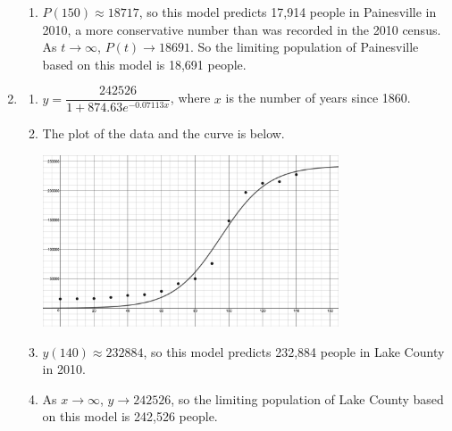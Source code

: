 \begin{enumerate}
\begin{enumerate}
\item $P(150) \approx 18717$, so this model predicts 17,914 people in Painesville in 2010, a more conservative number than was recorded in the 2010 census.  As $t \rightarrow \infty$, $P(t) \rightarrow 18691$.  So the limiting population of Painesville based on this model is 18,691 people.

\enlargethispage{\baselineskip}

\end{enumerate}

\item \begin{enumerate}  \item  $y = \dfrac{242526}{1+874.63e^{-0.07113x}}$, where $x$ is the number of years since 1860.

\item  The plot of the data and the curve is below.

\centerline{\includegraphics[height=2in]{./ApplicationsofExponentialandLogarithmicFunctionsGraphics/LAKECOUNTYLOGISTIC.jpg}} 

\item  $y(140) \approx 232884$, so this model predicts 232,884 people in Lake County in 2010.

\item  As $x \rightarrow \infty$, $y \rightarrow 242526$, so the limiting population of Lake County based on this model is 242,526 people.

\end{enumerate}

\end{enumerate}
